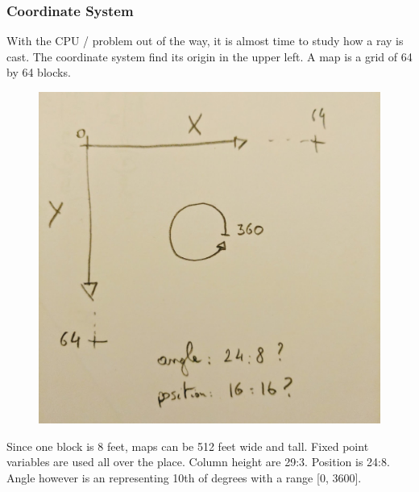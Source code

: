 \subsubsection{Coordinate System}
With the CPU / problem out of the way, it is almost time to study how a ray is cast. The coordinate system find its origin in the upper left. A map is a grid of 64 by 64 blocks. 
\begin{figure}[H]
  \centering
 \includegraphics[width=.5\textwidth]{imgs/drawings/coordinate_system.png}
\end{figure}
\par
Since one block is 8 feet, maps can be 512 feet wide and tall. Fixed point variables are used all over the place. Column height are 29:3. Position is 24:8. Angle however is an  representing 10th of degrees with a range [0, 3600].

















